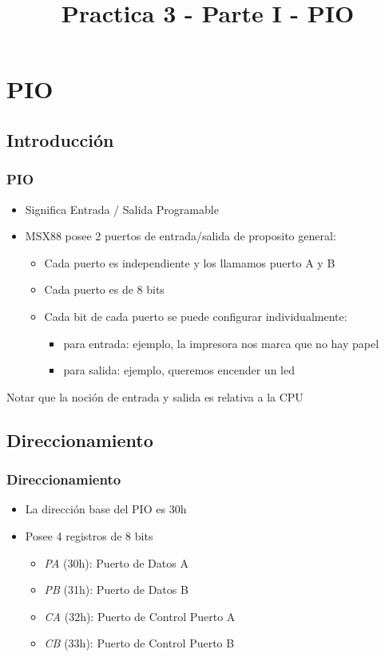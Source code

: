 \documentclass{beamer}
\title{Practica 3 - Parte I - PIO}
\begin{document}
\begin{frame}
\titlepage
\end{frame}

\section{PIO}
\subsection{Introducción}
\begin{frame}
\frametitle{PIO}
\begin{itemize}
 \item Significa Entrada / Salida Programable
 \item MSX88 posee 2 puertos de entrada/salida de proposito general:
 \begin{itemize}
   \item Cada puerto es independiente y los llamamos puerto A y B
   \item Cada puerto es de 8 bits 
   \item Cada bit de cada puerto se puede configurar individualmente:
   \begin{itemize}
     \item para entrada: ejemplo, la impresora nos marca que no hay papel
     \item para salida: ejemplo, queremos encender un led
   \end{itemize}
 \end{itemize}
\end{itemize}
\begin{block}{}
Notar que la noción de entrada y salida es relativa a la CPU
\end{block}
\end{frame}

\subsection{Direccionamiento}
\begin{frame}
\frametitle{Direccionamiento}
\begin{itemize}
 \item La dirección base del PIO es 30h
 \item Posee 4 registros de 8 bits
 \begin{itemize}
   \item \emph{PA} (30h): Puerto de Datos A
   \item \emph{PB} (31h): Puerto de Datos B
   \item \emph{CA} (32h): Puerto de Control Puerto A
   \item \emph{CB} (33h): Puerto de Control Puerto B
 \end{itemize}
 \end{itemize}
\end{frame}
\end{document}
